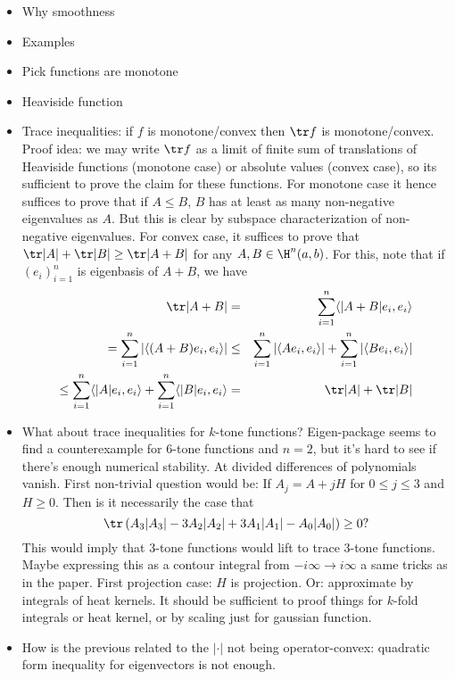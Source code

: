 \begin{itemize}
	\item Why smoothness
	\item Examples
	\item Pick functions are monotone
	\item Heaviside function
	\item Trace inequalities: if $f$ is monotone/convex then $\tr f$ is monotone/convex. Proof idea: we may write $\tr f$ as a limit of finite sum of translations of Heaviside functions (monotone case) or absolute values (convex case), so its sufficient to prove the claim for these functions. For monotone case it hence suffices to prove that if $A \leq B$, $B$ has at least as many non-negative eigenvalues as $A$. But this is clear by subspace characterization of non-negative eigenvalues. For convex case, it suffices to prove that $\tr |A| + \tr |B| \geq \tr |A + B|$ for any $A, B \in \H^{n}(a, b)$. For this, note that if $(e_{i})_{i = 1}^{n}$ is eigenbasis of $A + B$, we have
	\begin{eqnarray*}
		\tr |A + B| &=& \sum_{i = 1}^{n} \langle |A + B| e_{i}, e_{i} \rangle \\
		= \sum_{i = 1}^{n} \left|\langle (A + B) e_{i}, e_{i} \rangle \right| &\leq& \sum_{i = 1}^{n} \left|\langle A e_{i}, e_{i} \rangle \right| + \sum_{i = 1}^{n} \left|\langle B e_{i}, e_{i} \rangle \right| \\
		\leq \sum_{i = 1}^{n} \langle |A| e_{i}, e_{i} \rangle + \sum_{i = 1}^{n} \langle |B| e_{i}, e_{i} \rangle &=& \tr |A| + \tr |B|
	\end{eqnarray*}
	\item What about trace inequalities for $k$-tone functions? Eigen-package seems to find a counterexample for $6$-tone functions and $n = 2$, but it's hard to see if there's enough numerical stability. At divided differences of polynomials vanish. First non-trivial question would be:
	If $A_{j} = A + j H$ for $0 \leq j \leq 3$ and $H \geq 0$. Then is it necessarily the case that
	\[
		\tr \left(A_{3} |A_{3}| - 3 A_{2}|A_{2}| + 3 A_{1} |A_{1}| - A_{0} |A_{0}| \right) \geq 0?
	\]
	This would imply that $3$-tone functions would lift to trace $3$-tone functions. Maybe expressing this as a contour integral from $-i \infty \to i \infty$ a same tricks as in the paper. First projection case: $H$ is projection. Or: approximate by integrals of heat kernels. It should be sufficient to proof things for $k$-fold integrals or heat kernel, or by scaling just for gaussian function.
	\item How is the previous related to the $|\cdot|$ not being operator-convex: quadratic form inequality for eigenvectors is not enough.

\end{itemize}
